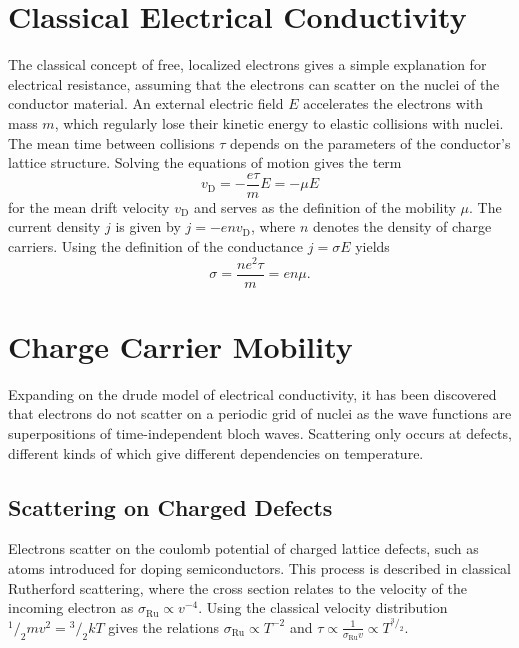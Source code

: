\section{Classical Electrical Conductivity}
The classical concept of free, localized electrons gives a simple explanation for electrical resistance, assuming that the electrons can scatter on the nuclei of the conductor material.
An external electric field $E$ accelerates the electrons with mass $m$, which regularly lose their kinetic energy to elastic collisions with nuclei.
The mean time between collisions $\tau$ depends on the parameters of the conductor's lattice structure.
Solving the equations of motion gives the term
\begin{equation*}
	v_\text{D} = - \frac{e \tau}{m} E = - \mu E
\end{equation*}
for the mean drift velocity $v_\text{D}$ and serves as the definition of the mobility $\mu$.
The current density $j$ is given by $j = - e n v_\text{D}$, where $n$ denotes the density of charge carriers.
Using the definition of the conductance $j = \sigma E$ yields
\begin{equation}\label{eq:classical-resistance}
	\sigma = \frac{n e^2 \tau}{m} = e n \mu.
\end{equation}

\section{Charge Carrier Mobility}
Expanding on the drude model of electrical conductivity, it has been discovered that electrons do not scatter on a periodic grid of nuclei as the wave functions are superpositions of time-independent bloch waves.
Scattering only occurs at defects, different kinds of which give different dependencies on temperature.

\subsection{Scattering on Charged Defects}
Electrons scatter on the coulomb potential of charged lattice defects, such as atoms introduced for doping semiconductors.
This process is described in classical Rutherford scattering, where the cross section relates to the velocity of the incoming electron as $\sigma_\text{Ru} \propto v^{-4}$.
Using the classical velocity distribution $^1/_2 m v^2 = {^3}/_2 k T$ gives the relations $\sigma_\text{Ru} \propto T^{-2}$ and $\tau \propto \frac{1}{\sigma_\text{Ru} v} \propto T^{{^3}/_2}$.

